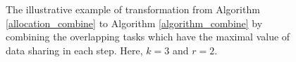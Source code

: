\documentclass[prodmode,acmtosn]{acmsmall}
\begin{document}
\begin{figure}[t]
\centering
{}
\caption{The illustrative example of transformation from Algorithm \ref{allocation_combine} to Algorithm \ref{algorithm_combine} by combining the overlapping tasks which have the maximal value of data sharing in each step. Here, $k\mathrm{=}3$ and $r\mathrm{=}2$.}
\label{figure_proof_allocation}
\end{figure}
\end{document}
